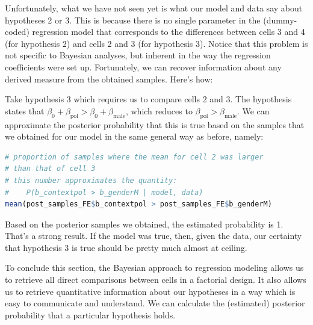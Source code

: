 \documentclass[nobib]{tufte-handout}
\begin{document}
Unfortunately, what we have not seen yet is what our model and data say about hypotheses 2 or 3. This is because there is no single parameter in the (dummy-coded) regression model that corresponds to the differences between cells 3 and 4 (for hypothesis 2) and cells 2 and 3 (for hypothesis 3). Notice that this problem is not specific to Bayesian analyses, but inherent in the way the regression coefficients were set up.
%
%
Fortunately, we can recover information about any derived measure from the obtained samples. Here's how:

Take hypothesis 3 which requires us to compare cells 2 and 3. The hypothesis states that
$\beta_0 + \beta_{\text{pol}} > \beta_0 + \beta_{\text{male}}$, which reduces to
$\beta_{\text{pol}} > \beta_{\text{male}}$. We can approximate the posterior probability that
this is true based on the samples that we obtained for our model in the same general way as
before, namely:

\bigskip

\begin{minipage}[]{1.1\textwidth}
\begin{lstlisting}[language=R]
# proportion of samples where the mean for cell 2 was larger 
# than that of cell 3 
# this number approximates the quantity:
#    P(b_contextpol > b_genderM | model, data)
mean(post_samples_FE$b_contextpol > post_samples_FE$b_genderM)
\end{lstlisting}
\end{minipage}

Based on the posterior samples we obtained, the estimated probability is 1. That's a strong result. If the model was true, then, given the data, our certainty that hypothesis 3 is true should be pretty much almost at ceiling.

To conclude this section, the Bayesian approach to regression modeling allows us to retrieve all direct comparisons between cells in a factorial design. It also allows us to retrieve quantitative information about our hypotheses in a way which is easy to communicate and understand. We can calculate the (estimated) posterior probability that a particular hypothesis holds. 
\end{document}

